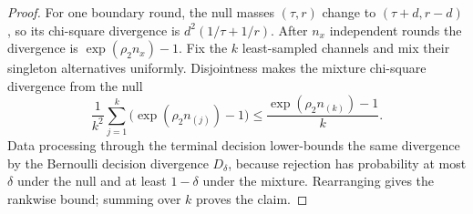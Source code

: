 \begin{proof}
For one boundary round, the null masses \((\tau,r)\) change to
\((\tau+d,r-d)\), so its chi-square divergence is
\(d^2(1/\tau+1/r)\).  After \(n_x\) independent rounds the divergence is
\(\exp(\rho_2n_x)-1\).  Fix the \(k\) least-sampled channels and mix their
singleton alternatives uniformly.  Disjointness makes the mixture
chi-square divergence from the null
\begin{equation}\label{eq:formal-results-075}
\frac1{k^2}\sum_{j=1}^k
\bigl(\exp(\rho_2n_{(j)})-1\bigr)
\le
\frac{\exp(\rho_2n_{(k)})-1}{k}.
\end{equation}
Data processing through the terminal decision lower-bounds the same divergence
by the Bernoulli decision divergence
\(D_\delta\), because rejection has probability at most \(\delta\) under the
null and at least \(1-\delta\) under the mixture.  Rearranging gives the
rankwise bound; summing over \(k\) proves the claim.
\end{proof}
